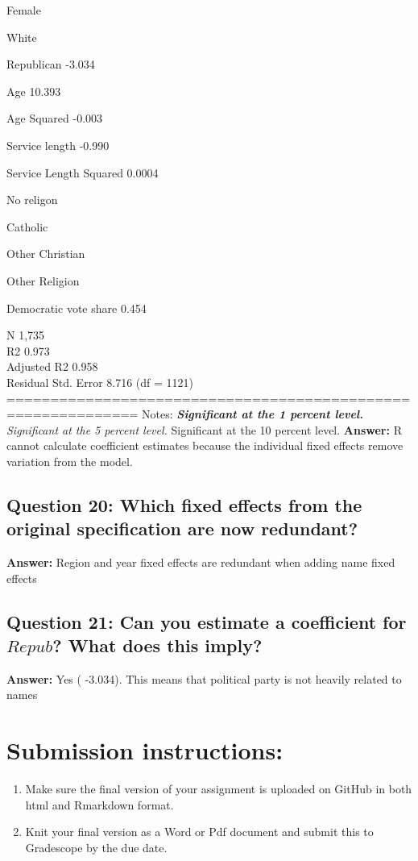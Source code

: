 \documentclass[
]{article}
\begin{document}
Female

White

Republican -3.034

Age 10.393

Age Squared -0.003

Service length -0.990

Service Length Squared 0.0004

No religon

Catholic

Other Christian

Other Religion

Democratic vote share 0.454

N 1,735\\
R2 0.973\\
Adjusted R2 0.958\\
Residual Std. Error 8.716 (df = 1121)\\
============================================================= Notes:
\emph{\textbf{Significant at the 1 percent level. }Significant at the 5
percent level. }Significant at the 10 percent level. \textbf{Answer:} R
cannot calculate coefficient estimates because the individual fixed
effects remove variation from the model.

\hypertarget{question-20-which-fixed-effects-from-the-original-specification-are-now-redundant}{%
\subsection{Question 20: Which fixed effects from the original
specification are now
redundant?}\label{question-20-which-fixed-effects-from-the-original-specification-are-now-redundant}}

\textbf{Answer:} Region and year fixed effects are redundant when adding
name fixed effects

\hypertarget{question-21-can-you-estimate-a-coefficient-for-repub-what-does-this-imply}{%
\subsection{\texorpdfstring{Question 21: Can you estimate a coefficient
for \(Repub\)? What does this
imply?}{Question 21: Can you estimate a coefficient for Repub? What does this imply?}}\label{question-21-can-you-estimate-a-coefficient-for-repub-what-does-this-imply}}

\textbf{Answer:} Yes ( -3.034). This means that political party is not
heavily related to names

\hypertarget{submission-instructions}{%
\section{Submission instructions:}\label{submission-instructions}}

\begin{enumerate}
\def\labelenumi{\arabic{enumi})}
\item
  Make sure the final version of your assignment is uploaded on GitHub
  in both html and Rmarkdown format.
\item
  Knit your final version as a Word or Pdf document and submit this to
  Gradescope by the due date.
\end{enumerate}
\end{document}
